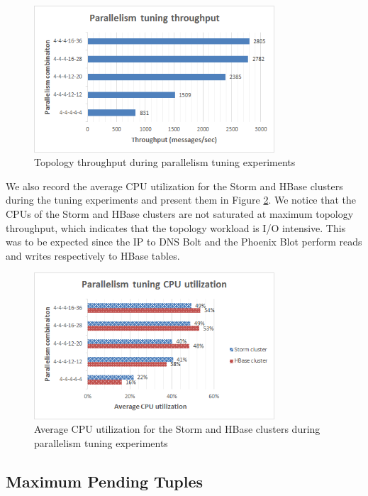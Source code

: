 \begin{figure}[H]
\centering
\includegraphics[width=0.8\textwidth]{figures/benchmarks_storm_tuning_throughput}
\caption{Topology throughput during parallelism tuning experiments}
\label{figure:benchmarks_storm_tuning_throughput}
\end{figure}

We also record the average CPU utilization for the Storm and HBase clusters during the tuning experiments and present them in Figure \ref{figure:benchmarks_storm_tuning_cpu}. We notice that the CPUs of the Storm and HBase clusters are not saturated at maximum topology throughput, which indicates that the topology workload is I/O intensive. This was to be expected since the IP to DNS Bolt and the Phoenix Blot perform reads and writes respectively to HBase tables.

\begin{figure}[H]
\centering
\includegraphics[width=0.8\textwidth]{figures/benchmarks_storm_tuning_cpu}
\caption{Average CPU utilization for the Storm and HBase clusters during parallelism tuning experiments}
\label{figure:benchmarks_storm_tuning_cpu}
\end{figure}

\subsection{Maximum Pending Tuples}

